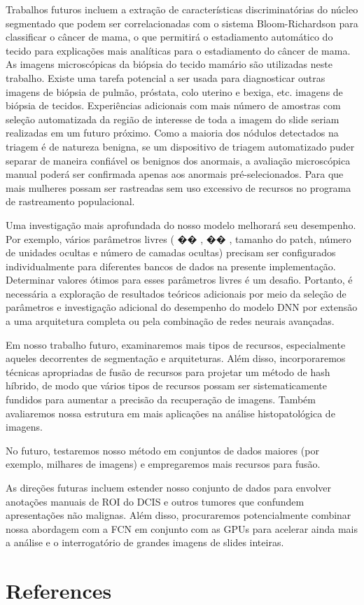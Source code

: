 \documentclass[preprint,12pt,authoryear]{elsarticle}
\begin{document}
Trabalhos futuros incluem a extração de características discriminatórias do núcleo segmentado que podem ser correlacionadas com o sistema Bloom-Richardson para classificar o câncer de mama, o que permitirá o estadiamento automático do tecido para explicações mais analíticas para o estadiamento do câncer de mama. As imagens microscópicas da biópsia do tecido mamário são utilizadas neste trabalho. Existe uma tarefa potencial a ser usada para diagnosticar outras imagens de biópsia de pulmão, próstata, colo uterino e bexiga, etc. imagens de biópsia de tecidos. Experiências adicionais com mais número de amostras com seleção automatizada da região de interesse de toda a imagem do slide seriam realizadas em um futuro próximo. Como a maioria dos nódulos detectados na triagem é de natureza benigna, se um dispositivo de triagem automatizado puder separar de maneira confiável os benignos dos anormais, a avaliação microscópica manual poderá ser confirmada apenas aos anormais pré-selecionados. Para que mais mulheres possam ser rastreadas sem uso excessivo de recursos no programa de rastreamento populacional.\citep{ISSACNIWAS2012}

Uma investigação mais aprofundada do nosso modelo melhorará seu desempenho. Por exemplo, vários parâmetros livres (  �� , �� , tamanho do patch, número de unidades ocultas e número de camadas ocultas) precisam ser configurados individualmente para diferentes bancos de dados na presente implementação. Determinar valores ótimos para esses parâmetros livres é um desafio. Portanto, é necessária a exploração de resultados teóricos adicionais por meio da seleção de parâmetros e investigação adicional do desempenho do modelo DNN por extensão a uma arquitetura completa ou pela combinação de redes neurais avançadas.\citep{FENG2018}

Em nosso trabalho futuro, examinaremos mais tipos de recursos, especialmente aqueles decorrentes de segmentação e arquiteturas. Além disso, incorporaremos técnicas apropriadas de fusão de recursos para projetar um método de hash híbrido, de modo que vários tipos de recursos possam ser sistematicamente fundidos para aumentar a precisão da recuperação de imagens. Também avaliaremos nossa estrutura em mais aplicações na análise histopatológica de imagens.\citep{ZHANG2015}

No futuro, testaremos nosso método em conjuntos de dados maiores (por exemplo, milhares de imagens) e empregaremos mais recursos para fusão. \citep{ZHANG2016}

As direções futuras incluem estender nosso conjunto de dados para envolver anotações manuais de ROI do DCIS e outros tumores que confundem apresentações não malignas. Além disso, procuraremos potencialmente combinar nossa abordagem com a FCN em conjunto com as GPUs para acelerar ainda mais a análise e o interrogatório de grandes imagens de slides inteiras. \citep{CRUZROA2018}





\pagebreak
\section*{References}

% 

\end{document}

